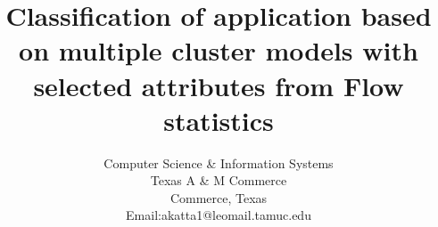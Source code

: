 \documentclass[conference]{IEEEtran}
\begin{document}
%
\title{Classification of application based on multiple cluster models with selected attributes from Flow statistics}


\author{
\IEEEauthorblockA
	{Computer Science \& Information Systems\\
	Texas A \& M Commerce\\
	Commerce, Texas\\
	Email:akatta1@leomail.tamuc.edu}
\and
{}
}

% 




\end{document}
